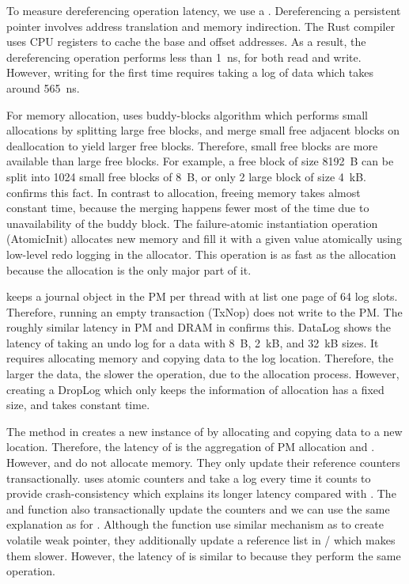 To measure dereferencing operation latency, we use a . Dereferencing a persistent pointer involves address translation and memory indirection. The Rust compiler uses CPU registers to cache the base and offset addresses. As a result, the dereferencing operation performs less than 1~ns, for both read and write. However, writing for the first time requires taking a log of data which takes around 565~ns.

For memory allocation, \This{} uses buddy-blocks algorithm which performs small allocations by splitting large free blocks, and merge small free adjacent blocks on deallocation to yield larger free blocks. Therefore, small free blocks are more available than large free blocks. For example, a free block of size 8192~B can be split into 1024 small free blocks of 8~B, or only 2 large block of size 4~kB.  confirms this fact. In contrast to allocation, freeing memory takes almost constant time, because the merging happens fewer most of the time due to unavailability of the buddy block. The failure-atomic instantiation operation (AtomicInit) allocates new memory and fill it with a given value atomically using low-level redo logging in the allocator. This operation is as fast as the allocation because the allocation is the only major part of it.

\This{} keeps a journal object in the PM per thread with at list one page of 64 log slots. Therefore, running an empty transaction (TxNop) does not write to the PM. The roughly similar latency in PM and DRAM in  confirms this. DataLog shows the latency of taking an undo log for a data with 8~B, 2~kB, and 32~kB sizes. It requires allocating memory and copying data to the log location. Therefore, the larger the data, the slower the operation, due to the allocation process. However, creating a DropLog which only keeps the information of allocation has a fixed size, and takes constant time.

The  method in  creates a new instance of  by allocating and copying data to a new location. Therefore, the latency of  is the aggregation of PM allocation and \memcpy{}. However,  and  do not allocate memory. They only update their reference counters transactionally.  uses atomic counters and take a log every time it counts to provide crash-consistency which explains its longer latency compared with . The  and  function also transactionally update the counters and we can use the same explanation as for . Although the  function use similar mechanism as  to create volatile weak pointer, they additionally update a reference list in / which makes them slower. However, the latency of  is similar to  because they perform the same operation.

